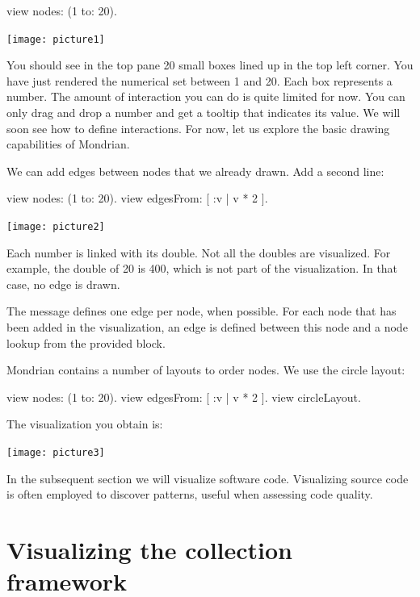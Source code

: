 \documentclass[a4paper,10pt,twoside]{book}
\begin{document}
\begin{code}{}
view nodes: (1 to: 20).
\end{code}
\begin{center}\texttt{[image: picture1]}\end{center}

You should see in the top pane 20 small boxes lined up in the top left corner. You have just rendered the numerical set between 1 and 20. Each box represents a number. The amount of interaction you can do is quite limited for now. You can only drag and drop a number and get a tooltip that indicates its value. We will soon see how to define interactions. For now, let us explore the basic drawing capabilities of Mondrian.

We can add edges between nodes that we already drawn. Add a second line:

\begin{code}{}
view nodes: (1 to: 20).
view edgesFrom: [ :v | v * 2 ].
\end{code}
\begin{center}\texttt{[image: picture2]}\end{center}

Each number is linked with its double. Not all the doubles are visualized. For example, the double of 20 is 400, which is not part of the visualization. In that case, no edge is drawn. 

The message  defines one edge per node, when possible. For each node that has been added in the visualization, an edge is defined between this node and a node lookup from the provided block.

Mondrian contains a number of layouts to order nodes. We use the circle layout:

\begin{code}{}
view nodes: (1 to: 20).
view edgesFrom: [ :v | v * 2 ].
view circleLayout.
\end{code}

The visualization you obtain is:

\begin{center}\texttt{[image: picture3]}\end{center}

In the subsequent section we will visualize software code. Visualizing source code is often employed to discover patterns, useful when assessing code quality.


\section{Visualizing the collection framework}
\end{document}
